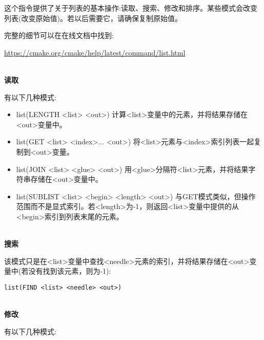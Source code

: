 这个指令提供了关于列表的基本操作:读取、搜索、修改和排序。某些模式会改变列表(改变原始值)。若以后需要它，请确保复制原始值。

完整的细节可以在在线文档中找到:

\url{https://cmake.org/cmake/help/latest/command/list.html}

\hspace*{\fill} \\ %
\noindent
\textbf{读取}

有以下几种模式:

\begin{itemize}
\item 
list(LENGTH <list> <out>) 计算<list>变量中的元素，并将结果存储在<out>变量中。

\item 
list(GET <list> <index>... <out>) 将<list>元素与<index>索引列表一起复制到<out>变量。

\item 
list(JOIN <list> <glue> <out>) 用<glue>分隔符<list>元素，并将结果字符串存储在<out>变量中。

\item 
list(SUBLIST <list> <begin> <length> <out>) 与GET模式类似，但操作范围而不是显式索引。若<length>为-1，则返回<list>变量中提供的从<begin>索引到列表末尾的元素。
\end{itemize}

\hspace*{\fill} \\ %
\noindent
\textbf{搜索}

该模式只是在<list>变量中查找<needle>元素的索引，并将结果存储在<out>变量中(若没有找到该元素，则为-1):

\begin{lstlisting}[style=styleCMake]
list(FIND <list> <needle> <out>)
\end{lstlisting}

\hspace*{\fill} \\ %
\noindent
\textbf{修改}

有以下几种模式:

